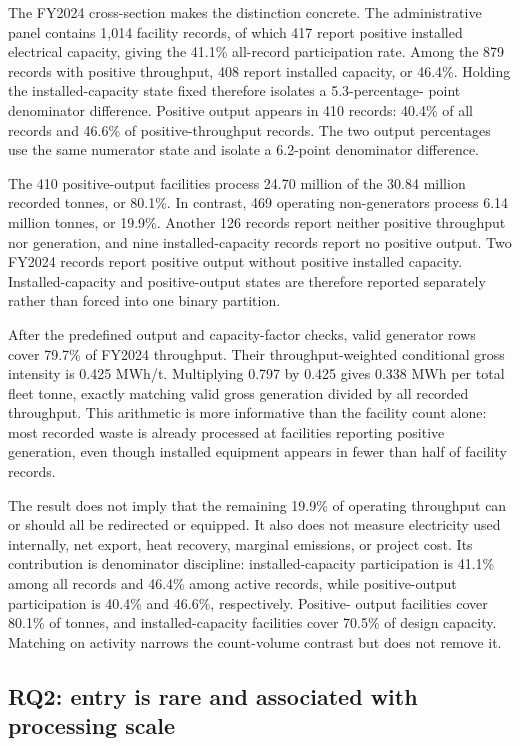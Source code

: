 \documentclass[12pt,a4paper]{article}
\begin{document}
The FY2024 cross-section makes the distinction concrete. The administrative
panel contains 1,014 facility records, of which 417 report positive installed
electrical capacity, giving the 41.1\% all-record participation rate. Among the
879 records with positive throughput, 408 report installed capacity, or 46.4\%.
Holding the installed-capacity state fixed therefore isolates a 5.3-percentage-
point denominator difference. Positive output appears in 410 records: 40.4\% of
all records and 46.6\% of positive-throughput records. The two output percentages
use the same numerator state and isolate a 6.2-point denominator difference.

The 410 positive-output facilities process 24.70 million of the 30.84 million
recorded tonnes, or 80.1\%. In contrast, 469 operating non-generators process
6.14 million tonnes, or 19.9\%. Another 126 records report neither positive
throughput nor generation, and nine installed-capacity records report no
positive output. Two FY2024 records report positive output without positive
installed capacity. Installed-capacity and positive-output states are therefore
reported separately rather than forced into one binary partition.

After the predefined output and capacity-factor checks, valid generator rows
cover 79.7\% of FY2024 throughput. Their throughput-weighted conditional gross
intensity is 0.425 MWh/t. Multiplying 0.797 by 0.425 gives 0.338 MWh per total
fleet tonne, exactly matching valid gross generation divided by all recorded
throughput. This arithmetic is more informative than the facility count alone:
most recorded waste is already processed at facilities reporting positive
generation, even though installed equipment appears in fewer than half of
facility records.

The result does not imply that the remaining 19.9\% of operating throughput can
or should all be redirected or equipped. It also does not measure electricity
used internally, net export, heat recovery, marginal emissions, or project
cost. Its contribution is denominator discipline: installed-capacity
participation is 41.1\% among all records and 46.4\% among active records, while
positive-output participation is 40.4\% and 46.6\%, respectively. Positive-
output facilities cover 80.1\% of tonnes, and installed-capacity facilities
cover 70.5\% of design capacity. Matching on activity narrows the count-volume
contrast but does not remove it.

\subsection{RQ2: entry is rare and associated with processing scale}
\end{document}
